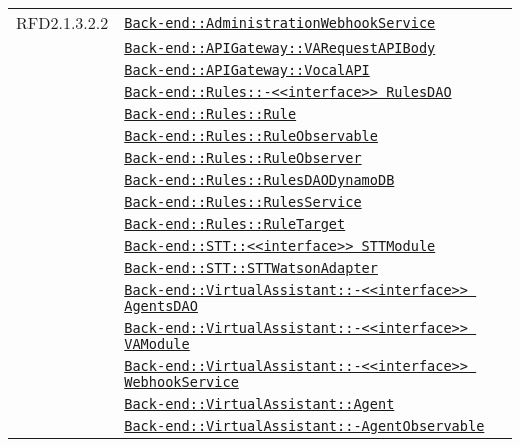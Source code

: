 \begin{longtable}{|>{\centering}m{3cm}|m{10cm}<{\centering}|}
RFD2.1.3.2.2 & \hyperref[Back-end::AdministrationWebhookService]{\texttt{Back-end::AdministrationWebhookService}}\\
& \hyperref[Back-end::APIGateway::VARequestAPIBody]{\texttt{Back-end::APIGateway::VARequestAPIBody}}\\
& \hyperref[Back-end::APIGateway::VocalAPI]{\texttt{Back-end::APIGateway::VocalAPI}}\\
& \hyperref[Back-end::Rules::<<interface>> RulesDAO]{\texttt{Back-end::Rules::-\linebreak <<interface>> RulesDAO}}\\
& \hyperref[Back-end::Rules::Rule]{\texttt{Back-end::Rules::Rule}}\\
& \hyperref[Back-end::Rules::RuleObservable]{\texttt{Back-end::Rules::RuleObservable}}\\
& \hyperref[Back-end::Rules::RuleObserver]{\texttt{Back-end::Rules::RuleObserver}}\\
& \hyperref[Back-end::Rules::RulesDAODynamoDB]{\texttt{Back-end::Rules::RulesDAODynamoDB}}\\
& \hyperref[Back-end::Rules::RulesService]{\texttt{Back-end::Rules::RulesService}}\\
& \hyperref[Back-end::Rules::RuleTarget]{\texttt{Back-end::Rules::RuleTarget}}\\
& \hyperref[Back-end::STT::<<interface>> STTModule]{\texttt{Back-end::STT::<<interface>> STTModule}}\\
& \hyperref[Back-end::STT::STTWatsonAdapter]{\texttt{Back-end::STT::STTWatsonAdapter}}\\
& \hyperref[Back-end::VirtualAssistant::<<interface>> AgentsDAO]{\texttt{Back-end::VirtualAssistant::-\linebreak <<interface>> AgentsDAO}}\\
& \hyperref[Back-end::VirtualAssistant::<<interface>> VAModule]{\texttt{Back-end::VirtualAssistant::-\linebreak <<interface>> VAModule}}\\
& \hyperref[Back-end::VirtualAssistant::<<interface>> WebhookService]{\texttt{Back-end::VirtualAssistant::-\linebreak <<interface>> WebhookService}}\\
& \hyperref[Back-end::VirtualAssistant::Agent]{\texttt{Back-end::VirtualAssistant::Agent}}\\
& \hyperref[Back-end::VirtualAssistant::AgentObservable]{\texttt{Back-end::VirtualAssistant::-\linebreak AgentObservable}}\\

\end{longtable}
